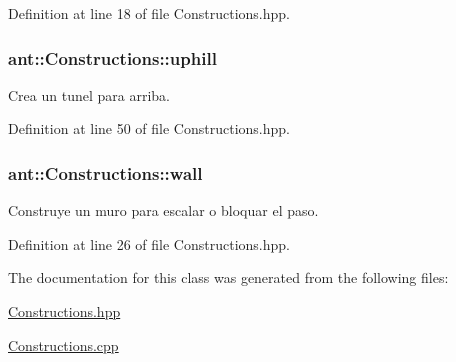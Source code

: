 Definition at line 18 of file Constructions.\+hpp.

\hypertarget{classant_1_1_constructions_a9c986c906a803a6b777ad383060699d6}{
\subsubsection[{uphill}]{ ant\+::\+Constructions\+::uphill\hspace{0.3cm}{\ttfamily [static]}}}\label{classant_1_1_constructions_a9c986c906a803a6b777ad383060699d6}


Crea un tunel para arriba. 



Definition at line 50 of file Constructions.\+hpp.

\hypertarget{classant_1_1_constructions_a5ce348044e05b13b73f170fe2ced494d}{
\subsubsection[{wall}]{ ant\+::\+Constructions\+::wall\hspace{0.3cm}{\ttfamily [static]}}}\label{classant_1_1_constructions_a5ce348044e05b13b73f170fe2ced494d}


Construye un muro para escalar o bloquar el paso. 



Definition at line 26 of file Constructions.\+hpp.



The documentation for this class was generated from the following files\+:\begin{DoxyCompactItemize}
\item 
\hyperlink{_constructions_8hpp}{Constructions.\+hpp}\item 
\hyperlink{_constructions_8cpp}{Constructions.\+cpp}\end{DoxyCompactItemize}
